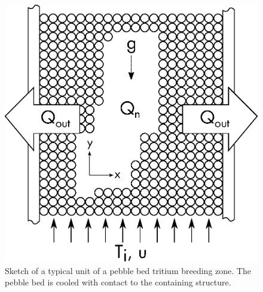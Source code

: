 \begin{figure}[ht]
	\centering
	\includegraphics[width=\singleimagewidth]{figures/x-domain.eps} 
	\caption{Sketch of a typical unit of a pebble bed tritium breeding zone. The pebble bed is cooled with contact to the containing structure.}
	\label{fig:solid-breeder-sketch}
\end{figure}


